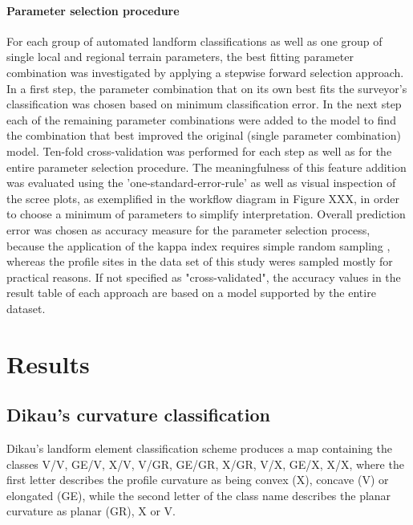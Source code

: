 \documentclass[preprint,12pt,authoryear]{elsarticle}
\begin{document}
\paragraph{Parameter selection procedure} For each group of automated landform classifications as well as one group of single local and regional terrain parameters, the best fitting parameter combination was investigated by applying a stepwise forward selection approach. In a first step, the parameter combination that on its own best fits the surveyor's classification was chosen based on minimum classification error. In the next step each of the remaining parameter combinations were added to the model to find the combination that best improved the original (single parameter combination) model. Ten-fold cross-validation was performed for each step as well as for the entire parameter selection procedure. The meaningfulness of this feature addition was evaluated using the 'one-standard-error-rule' \citep{James2013} as well as visual inspection of the scree plots, as exemplified in the workflow diagram in Figure XXX, in order to choose a minimum of parameters to simplify interpretation. Overall prediction error was chosen as accuracy measure for the parameter selection process, because the application of the kappa index requires simple random sampling \citep{Congalton1991}, whereas the profile sites in the data set of this study weres sampled mostly for practical reasons. If not specified as "cross-validated", the accuracy values in the result table of each approach are based on a model supported by the entire dataset. 
\section{Results}
\subsection{Dikau's curvature classification}
Dikau's landform element classification scheme produces a map containing the classes V/V, GE/V, X/V, V/GR, GE/GR, X/GR, V/X, GE/X, X/X, where the first letter describes the profile curvature as being convex (X), concave (V) or elongated (GE), while the second letter of the class name describes the planar curvature as planar (GR), X or V.
\end{document}
